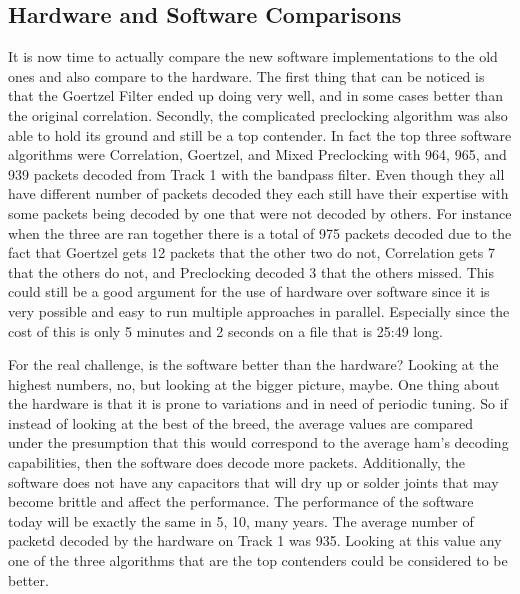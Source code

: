 \subsection{Hardware and Software Comparisons}
It is now time to actually compare the new software implementations to the old ones and also compare to the hardware. The first thing that can be noticed is that the Goertzel Filter ended up doing very well, and in some cases better than the original correlation. Secondly, the complicated preclocking algorithm was also able to hold its ground and still be a top contender. In fact the top three software algorithms were Correlation, Goertzel, and Mixed Preclocking with 964, 965, and 939 packets decoded from Track 1 with the bandpass filter. Even though they all have different number of packets decoded they each still have their expertise with some packets being decoded by one that were not decoded by others. For instance when the three are ran together there is a total of 975 packets decoded due to the fact that Goertzel gets 12 packets that the other two do not, Correlation gets 7 that the others do not, and Preclocking decoded 3 that the others missed. This could still be a good argument for the use of hardware over software since it is very possible and easy to run multiple approaches in parallel. Especially since the cost of this is only 5 minutes and 2 seconds on a file that is 25:49 long.

For the real challenge, is the software better than the hardware? Looking at the highest numbers, no, but looking at the bigger picture, maybe. One thing about the hardware is that it is prone to variations and in need of periodic tuning. So if instead of looking at the best of the breed, the average values are compared under the presumption that this would correspond to the average ham's decoding capabilities, then the software does decode more packets. Additionally, the software does not have any capacitors that will dry up or solder joints that may become brittle and affect the performance. The performance of the software today will be exactly the same in 5, 10, many years. The average number of packetd decoded by the hardware on Track 1 was 935. Looking at this value any one of the three algorithms that are the top contenders could be considered to be better.

